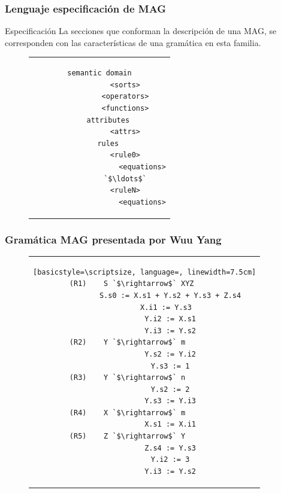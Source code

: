 \documentclass[10pt, xcolor=table]{beamer}
\begin{document}
\begin{frame}[fragile]
    \frametitle{Lenguaje especificación de MAG}

    \begin{block}{Especificación}
    La secciones que conforman la descripción de una MAG, se corresponden con las características de una gramática en esta familia.
    \end{block}
    
\begin{figure}[h]
\begin{center}
\begin{tabular}{c}
 \begin{lstlisting}[language=specmag, basicstyle=\small, linewidth=7cm]
    semantic domain
            <sorts>
            <operators>
            <functions>
    attributes
            <attrs>
    rules
            <rule0>
                    <equations>
            `$\ldots$`
            <ruleN>
                    <equations>
\end{lstlisting} 
\end{tabular}
\end{center}
\end{figure}
\end{frame}

\begin{frame}[fragile]
\frametitle{Gramática MAG presentada por Wuu Yang}

\begin{figure}[h]
\begin{center}
\begin{tabular}{c}
\begin{lstlisting}[basicstyle=\scriptsize, language=, linewidth=7.5cm]
(R1)    S `$\rightarrow$` XYZ      
            S.s0 := X.s1 + Y.s2 + Y.s3 + Z.s4
            X.i1 := Y.s3  
            Y.i2 := X.s1
            Y.i3 := Y.s2
(R2)    Y `$\rightarrow$` m        
            Y.s2 := Y.i2
            Y.s3 := 1
(R3)    Y `$\rightarrow$` n        
            Y.s2 := 2
            Y.s3 := Y.i3
(R4)    X `$\rightarrow$` m        
            X.s1 := X.i1
(R5)    Z `$\rightarrow$` Y        
            Z.s4 := Y.s3
            Y.i2 := 3
            Y.i3 := Y.s2
\end{lstlisting} 
\end{tabular}
\end{center}
\end{figure}
\end{frame}
\end{document}
